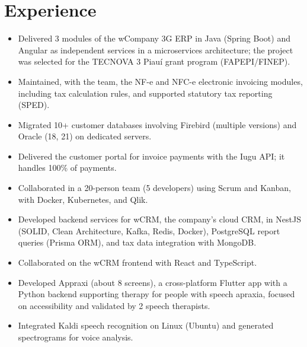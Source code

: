 \section{Experience}

\begin{itemize}
	\item Delivered 3 modules of the wCompany 3G ERP in Java (Spring Boot) and Angular as independent services in a microservices architecture; the project was selected for the TECNOVA 3 Piauí grant program (FAPEPI/FINEP).
	\item Maintained, with the team, the NF-e and NFC-e electronic invoicing modules, including tax calculation rules, and supported statutory tax reporting (SPED).
	\item Migrated 10+ customer databases involving Firebird (multiple versions) and Oracle (18, 21) on dedicated servers.
	\item Delivered the customer portal for invoice payments with the Iugu API; it handles 100\% of payments.
	\item Collaborated in a 20-person team (5 developers) using Scrum and Kanban, with Docker, Kubernetes, and Qlik.
\end{itemize}

\begin{itemize}
	\item Developed backend services for wCRM, the company's cloud CRM, in NestJS (SOLID, Clean Architecture, Kafka, Redis, Docker), PostgreSQL report queries (Prisma ORM), and tax data integration with MongoDB.
	\item Collaborated on the wCRM frontend with React and TypeScript.
\end{itemize}

\begin{itemize}
	\item Developed Appraxi (about 8 screens), a cross-platform Flutter app with a Python backend supporting therapy for people with speech apraxia, focused on accessibility and validated by 2 speech therapists.
	\item Integrated Kaldi speech recognition on Linux (Ubuntu) and generated spectrograms for voice analysis.
\end{itemize}
